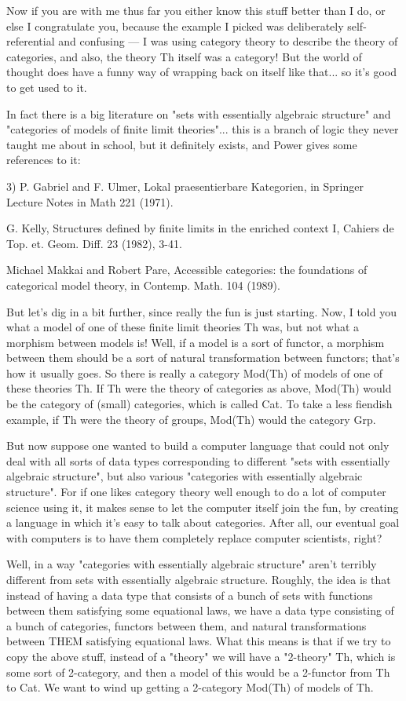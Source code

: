 Now if you are with me thus far you either know this stuff better
than I do, or else I congratulate you, because the example I 
picked was deliberately self-referential and confusing --- I was
using category theory to describe the theory of categories, and also,
the theory Th itself was a category!  But the world of thought does have
a funny way of wrapping back on itself like that... so it's good
to get used to it.

In fact there is a big literature on "sets with essentially
algebraic structure" and "categories of models of finite limit
theories"... this is a branch of logic they never taught me about 
in school, but it definitely exists, and Power gives some references
to it:

3) P. Gabriel and F. Ulmer, Lokal praesentierbare Kategorien, in
Springer Lecture Notes in Math 221 (1971).

G. Kelly, Structures defined by finite limits in the enriched
context I, Cahiers de Top. et. Geom. Diff. 23 (1982), 3-41.

Michael Makkai and Robert Pare, Accessible categories: the foundations
of categorical model theory, in Contemp. Math. 104 (1989).


But let's dig in a bit further, since really the fun is just 
starting.  Now, I told you what a model of one of these finite
limit theories Th was, but not what a morphism between models
is!  Well, if a model is a sort of functor, a morphism between
them should be a sort of natural transformation between functors; 
that's how it usually goes.  So there is really a category
Mod(Th) of models of one of these theories Th.  If Th were the
theory of categories as above, Mod(Th) would be the category of 
(small) categories, which is called Cat.  To take a less fiendish 
example, if Th were the theory of groups, Mod(Th) would the category 
Grp.

But now suppose one wanted to build a computer language that could
not only deal with all sorts of data types corresponding to different
"sets with essentially algebraic structure", but also various 
"categories with essentially algebraic structure".  For if
one likes category theory well enough to do a lot of computer
science using it, it makes sense to let the computer itself
join the fun, by creating a language in which it's easy to 
talk about categories.  After all, our eventual goal with computers 
is to have them completely replace computer scientists, right?  

Well, in a way "categories with essentially algebraic
structure" aren't terribly different from sets with essentially 
algebraic structure.  Roughly, the idea is that instead of having a
data type that consists of a bunch of sets with functions between
them satisfying some equational laws, we have a data type consisting
of a bunch of categories, functors between them, and natural
transformations between THEM satisfying equational laws.  
What this means is that if we try to copy the above
stuff, instead of a "theory" we will have a "2-theory" Th, which
is some sort of 2-category, and then a model of this would be
a 2-functor from Th to Cat.  We want to wind up getting a 2-category
Mod(Th) of models of Th.   

